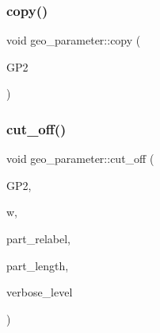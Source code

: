 \subsubsection{\texorpdfstring{copy()}{copy()}}
{\footnotesize\ttfamily void geo\+\_\+parameter\+::copy (\begin{DoxyParamCaption}\item[{\mbox{\hyperlink{classgeo__parameter}{geo\+\_\+parameter}} \&}]{G\+P2 }\end{DoxyParamCaption})}

\mbox{\label{classgeo__parameter_a88ddcdf4c59071a89cae32add3747759}} 
\subsubsection{\texorpdfstring{cut\+\_\+off()}{cut\_off()}}
{\footnotesize\ttfamily void geo\+\_\+parameter\+::cut\+\_\+off (\begin{DoxyParamCaption}\item[{\mbox{\hyperlink{classgeo__parameter}{geo\+\_\+parameter}} \&}]{G\+P2,  }\item[{\mbox{\hyperlink{galois_8h_a09fddde158a3a20bd2dcadb609de11dc}{I\+NT}}}]{w,  }\item[{\mbox{\hyperlink{galois_8h_a09fddde158a3a20bd2dcadb609de11dc}{I\+NT}} $\ast$\&}]{part\+\_\+relabel,  }\item[{\mbox{\hyperlink{galois_8h_a09fddde158a3a20bd2dcadb609de11dc}{I\+NT}} $\ast$\&}]{part\+\_\+length,  }\item[{\mbox{\hyperlink{galois_8h_a09fddde158a3a20bd2dcadb609de11dc}{I\+NT}}}]{verbose\+\_\+level }\end{DoxyParamCaption})}

\mbox{\label{classgeo__parameter_a4a8521129ea64b169d26abf5ff0ce0d9}} 

